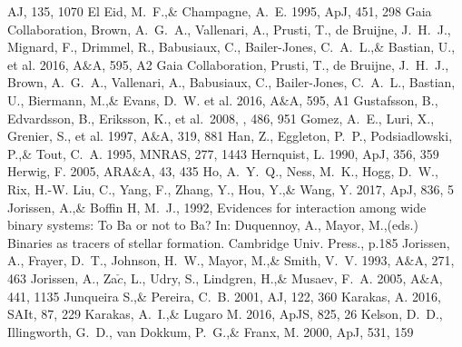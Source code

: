 \documentclass[a4paper,fleqn,usenatbib]{mnras}
\begin{document}
\begin{thebibliography}{99}
AJ, 135, 1070
El Eid, M.~F.,\& Champagne, A.~E. 1995, 
ApJ, 451, 298
Gaia Collaboration, Brown, A.~G.~A., Vallenari, A., Prusti, T., de Bruijne, J.~H.~J., Mignard, F., Drimmel, R., Babusiaux, C., Bailer-Jones, C.~A.~L.,\& Bastian, U., et al. 2016, 
A$\&$A, 595, A2
Gaia Collaboration, Prusti, T., de Bruijne, J.~H.~J., Brown, A.~G.~A., Vallenari, A., Babusiaux, C., Bailer-Jones, C.~A.~L., Bastian, U., Biermann, M.,\& Evans, D.~W. et al. 2016, 
A$\&$A, 595, A1
 Gustafsson, B., Edvardsson, B., Eriksson, K., et al.\ 2008, \aap, 486, 951 
Gomez, A.~E., Luri, X., Grenier, S., et al. 1997, 
A$\&$A, 319, 881
Han, Z., Eggleton, P.~P., Podsiadlowski, P.,\& Tout, C.~A. 1995, 
MNRAS, 277, 1443
Hernquist, L. 1990, 
ApJ, 356, 359
Herwig, F. 2005, 
ARA$\&$A, 43, 435
Ho, A.~Y.~Q., Ness, M.~K., Hogg, D.~W., Rix, H.-W. Liu, C., Yang, F., Zhang, Y., Hou, Y.,\& Wang, Y. 2017, 
ApJ, 836, 5
Jorissen, A.,\& Boffin H, M.~J., 1992, 
Evidences for interaction among wide binary systems: To Ba or not to Ba? In: Duquennoy, A., Mayor, M.,(eds.) Binaries as tracers of stellar formation. Cambridge Univ. Press., p.185
Jorissen, A., Frayer, D.~T., Johnson, H.~W., Mayor, M.,\& Smith, V.~V. 1993, 
A$\&$A, 271, 463
Jorissen, A., Za$\check{c}$, L., Udry, S., Lindgren, H.,\& Musaev, F.~A. 2005, 
A$\&$A, 441, 1135
Junqueira S.,\& Pereira, C.~B. 2001, 
AJ, 122, 360
Karakas, A. 2016, 
SAIt, 87, 229
Karakas, A.~I.,\& Lugaro M. 2016, 
ApJS, 825, 26
Kelson, D.~D., Illingworth, G.~D., van Dokkum, P.~G.,\& Franx, M. 2000, ApJ, 531, 159

\end{thebibliography}
\end{document}
